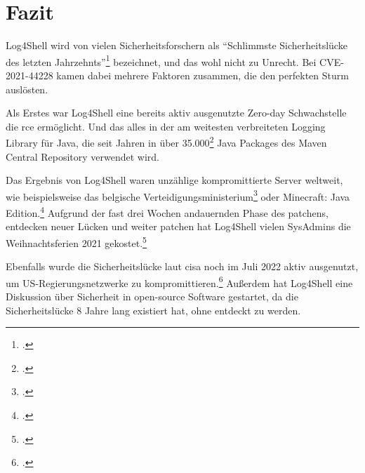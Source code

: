 
\section{Fazit}\label{sec:fazit}
Log4Shell wird von vielen Sicherheitsforschern als ``Schlimmste Sicherheitslücke des letzten Jahrzehnts''\footcite{guardianArticle} bezeichnet, und das wohl nicht zu Unrecht.
Bei CVE-2021-44228 kamen dabei mehrere Faktoren zusammen, die den perfekten Sturm auslösten.

Als Erstes war Log4Shell eine bereits aktiv ausgenutzte Zero-day Schwachstelle die \gls{rce} ermöglicht.
Und das alles in der am weitesten verbreiteten Logging Library für Java, die seit Jahren in über 35.000\footcite{impact} Java Packages des Maven Central Repository verwendet wird.

Das Ergebnis von Log4Shell waren unzählige kompromittierte Server weltweit, wie beispielsweise das belgische Verteidigungsministerium\footcite{zdNet} oder Minecraft: Java Edition.\footcite{minecraftForum}
Aufgrund der fast drei Wochen andauernden Phase des patchens, entdecken neuer Lücken und weiter patchen hat Log4Shell vielen SysAdmins die Weihnachtsferien 2021 gekostet.\footcite{kaspersky}

Ebenfalls wurde die Sicherheitslücke laut \gls{cisa} noch im Juli 2022 aktiv ausgenutzt, um US-Regierungsnetzwerke zu kompromittieren.\footcite{cisaAlert}
Außerdem hat Log4Shell eine Diskussion über Sicherheit in open-source Software gestartet, da die Sicherheitslücke 8 Jahre lang existiert hat, ohne entdeckt zu werden.
\clearpage